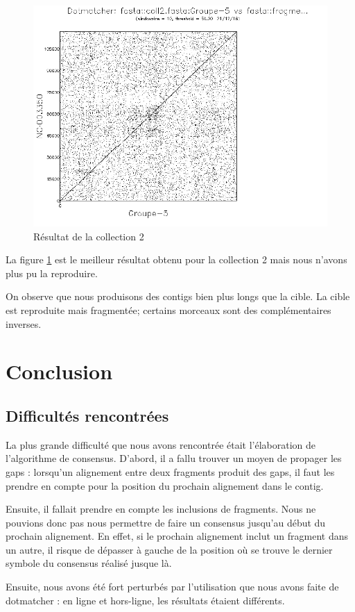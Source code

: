 \documentclass[a4paper, 12pt, titlepage]{article}
\begin{document}
\begin{figure}
 \centering
 \includegraphics[scale=0.4]{figures/dotmatcherc2.png}
 \caption{Résultat de la collection 2}
 \label{dm2}
\end{figure}
La figure \ref{dm2} est le meilleur résultat obtenu pour la collection 2
mais nous n'avons plus pu la reproduire.

On observe que nous produisons des contigs bien plus longs que la cible.
La cible est reproduite mais fragmentée;
certains morceaux sont des complémentaires inverses.

\section{Conclusion}
\subsection{Difficultés rencontrées}
La plus grande difficulté que nous avons rencontrée était l'élaboration de
l'algorithme de consensus.
D'abord, il a fallu trouver un moyen de propager les gaps :
lorsqu'un alignement entre deux fragments produit des gaps, il faut
les prendre en compte pour la position du prochain alignement dans le contig.

Ensuite, il fallait prendre en compte les inclusions de fragments.
Nous ne pouvions donc pas nous permettre de faire un consensus
jusqu'au début du prochain alignement.
En effet, si le prochain alignement inclut un fragment dans un autre, il risque
de dépasser à gauche de la position où se trouve le dernier symbole du
consensus réalisé jusque là.

Ensuite, nous avons été fort perturbés par l'utilisation que nous avons faite
de dotmatcher : en ligne et hors-ligne, les résultats étaient différents.
\end{document}
